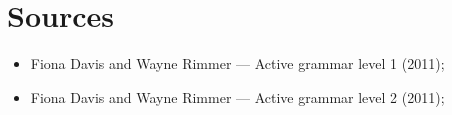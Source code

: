 \section*{Sources}
\label{sec:sources}

\begin{itemize}
    \item[] Fiona Davis and Wayne Rimmer --- Active grammar level 1 (2011);
    \item[] Fiona Davis and Wayne Rimmer --- Active grammar level 2 (2011);
\end{itemize}
